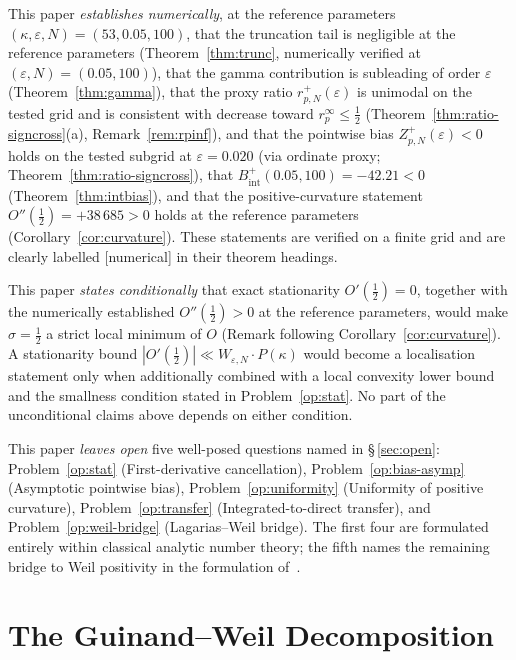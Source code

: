 \documentclass[11pt]{article}
\begin{document}
This paper \emph{establishes numerically}, at the reference parameters
$(\kappa,\varepsilon,N)=(53,0.05,100)$,
that the truncation tail is negligible at the reference parameters
(Theorem~\ref{thm:trunc}, numerically verified at
$(\varepsilon,N)=(0.05,100)$),
that the gamma contribution is
subleading of order $\varepsilon$ (Theorem~\ref{thm:gamma}), that
the proxy ratio $r^+_{p,N}(\varepsilon)$ is unimodal on the
tested grid and is consistent with decrease toward $r_p^{\infty}\le\tfrac12$
(Theorem~\ref{thm:ratio-signcross}(a),
Remark~\ref{rem:rpinf}), and that the pointwise
bias $Z_{p,N}^+(\varepsilon)<0$ holds on the tested subgrid at
$\varepsilon=0.020$ (via ordinate proxy; Theorem~\ref{thm:ratio-signcross}), that
$B_{\mathrm{int}}^+(0.05,100)=-42.21<0$ (Theorem~\ref{thm:intbias}), and that
the positive-curvature statement $O''(\tfrac12)=+38\,685>0$ holds at
the reference parameters (Corollary~\ref{cor:curvature}).
These statements are verified on a finite grid and are clearly labelled
[numerical] in their theorem headings.

This paper \emph{states conditionally} that exact stationarity
$O'(\tfrac12)=0$, together with the numerically established
$O''(\tfrac12)>0$ at the reference parameters, would make
$\sigma=\tfrac12$ a strict local minimum of $O$
(Remark following Corollary~\ref{cor:curvature}).
A stationarity bound $|O'(\tfrac12)|\ll W_{\varepsilon,N}\cdot P(\kappa)$ would
become a localisation statement only when additionally combined with
a local convexity lower bound and the smallness condition stated in
Problem~\ref{op:stat}.
No part of the unconditional claims above depends on either condition.

This paper \emph{leaves open} five well-posed questions named in
\S\,\ref{sec:open}: Problem~\ref{op:stat} (First-derivative cancellation),
Problem~\ref{op:bias-asymp} (Asymptotic pointwise bias),
Problem~\ref{op:uniformity} (Uniformity of positive curvature),
Problem~\ref{op:transfer} (Integrated-to-direct transfer), and
Problem~\ref{op:weil-bridge} (Lagarias--Weil bridge).
The first four are formulated entirely within classical analytic number
theory; the fifth names the remaining bridge to Weil positivity in
the formulation of~\cite{Lagarias}.

\section{The Guinand--Weil Decomposition}
\label{sec:gw}
\end{document}

